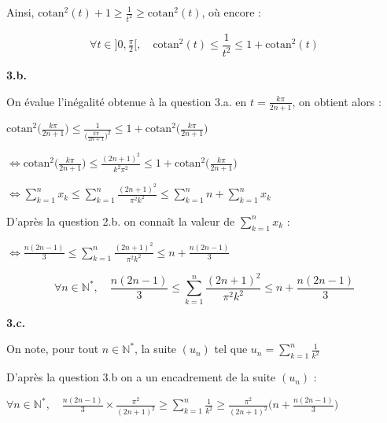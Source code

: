 \documentclass[11pt]{article}
\newcommand{\bfrac}[2]{\displaystyle\frac{#1}{#2}}
\newcommand{\N}{\mathbb{N}}
\newcommand{\cotan}{\text{cotan}}
\begin{document}
\vspace{5px}

\noindent Ainsi, $\cotan^2(t) + 1 \geq \bfrac{1}{t^2} \geq \cotan^2(t)$, où encore :

\vspace{5px}

\[\boxed{\; \forall t \in ]0, \tfrac{\pi}{2}[, \quad \cotan^2(t) \leq \bfrac{1}{t^2} \leq 1+\cotan^2(t) \;} \]

\vspace{10px}

\newpage

\textbf{3.b.}

\noindent On évalue l'inégalité obtenue à la question 3.a. en $t = \bfrac{k\pi}{2n+1}$, on obtient alors :

\begin{center}
$\cotan^2\Bigg(\bfrac{k\pi}{2n+1}\Bigg) \leq \bfrac{1}{\big(\frac{k\pi}{2n+1}\big)^2} \leq 1+\cotan^2\Bigg(\bfrac{k\pi}{2n+1}\Bigg)$

$\Longleftrightarrow \cotan^2\Bigg(\bfrac{k\pi}{2n+1}\Bigg) \leq \bfrac{(2n+1)^2}{k^2\pi^2} \leq 1+\cotan^2\Bigg(\bfrac{k\pi}{2n+1}\Bigg)$

$\Longleftrightarrow \displaystyle\sum_{k=1}^n x_k \leq \displaystyle\sum_{k=1}^n \bfrac{(2n+1)^2}{\pi^2 k^2} \leq \sum_{k=1}^n n + \sum_{k=1}^n x_k$

\vspace{5px}

D'après la question 2.b. on connaît la valeur de $\sum_{k=1}^n x_k$ :

\vspace{5px}

$\Longleftrightarrow \bfrac{n(2n-1)}{3} \leq \sum_{k=1}^n \bfrac{(2n+1)^2}{\pi^2 k^2} \leq n + \bfrac{n(2n-1)}{3}$
\end{center}

\[\boxed{\; \forall n \in \N^*, \quad \bfrac{n(2n-1)}{3} \leq \sum_{k=1}^n \bfrac{(2n+1)^2}{\pi^2 k^2} \leq n + \bfrac{n(2n-1)}{3} \;}\]

\vspace{10px}

\textbf{3.c.}

\noindent On note, pour tout $n \in \N^*$, la suite $(u_n)$ tel que $u_n = \displaystyle\sum_{k=1}^n \bfrac{1}{k^2}$

\noindent D'après la question 3.b on a un encadrement de la suite $(u_n)$ :

$\forall n \in \N^*, \quad \bfrac{n(2n-1)}{3}\times \bfrac{\pi^2}{(2n+1)^2} \geq \sum_{k=1}^n \frac{1}{k^2} \geq \bfrac{\pi^2}{(2n+1)^2} \Bigg( n + \bfrac{n(2n-1)}{3} \Bigg)$
\end{document}
